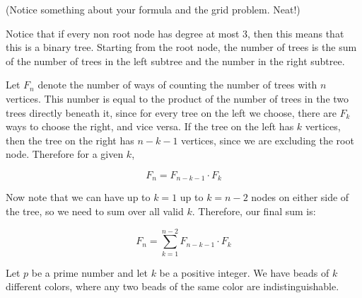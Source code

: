 \documentclass[11pt]{article}
\begin{document}
\begin{ResumeParts}
(Notice something about your formula and the grid problem. Neat!)

\begin{solution}
  Notice that if every non root node has degree at most 3, then this means that this is a binary tree. Starting from the root node, the number of trees is the sum of the number of trees in the left subtree and the number in the right subtree. 

  Let $F_n$ denote the number of ways of counting the number of trees with $n$ vertices. This number is equal to the product of the number of trees in the two trees directly beneath it, since for every tree on the left we choose, there are $F_k$ ways to choose the right, and vice versa. If the tree on the left has $k$ vertices, then the tree on the right has $n-k-1$ vertices, since we are excluding the root node. Therefore for a given $k$, 

  \[ F_n = F_{n-k-1} \cdot F_k\]

  Now note that we can have up to $k = 1$ up to $k = n -2$ nodes on either side of the tree, so we need to sum over all valid $k$. Therefore, our final sum is:

  \[ F_n = \sum_{k = 1}^{n - 2} F_{n-k-1} \cdot F_k\]
  
\end{solution}

\end{ResumeParts}
\pagebreak
{}

Let $p$ be a prime number and let $k$ be a positive integer.
We have beads of
$k$ different colors, where any two beads of the same color are indistinguishable.
\end{document}
